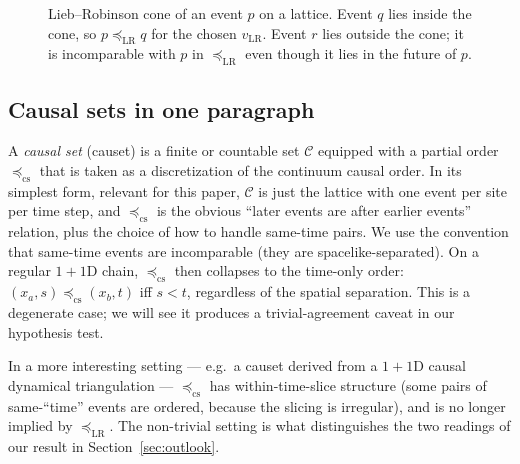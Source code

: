 \documentclass[11pt,a4paper]{article}
\theoremstyle{definition}
\theoremstyle{plain}
\theoremstyle{remark}
\newcommand{\LR}{\mathrm{LR}}
\newcommand{\cs}{\mathrm{cs}}
\begin{document}
\begin{figure}[h]
\centering
{}
\caption{Lieb--Robinson cone of an event $p$ on a lattice.  Event $q$
lies inside the cone, so $p \preceq_{\LR} q$ for the chosen $v_{\LR}$.
Event $r$ lies outside the cone; it is incomparable with $p$ in
$\preceq_{\LR}$ even though it lies in the future of $p$.}
\label{fig:lr-cone}
\end{figure}

\subsection{Causal sets in one paragraph}

A \emph{causal set} (causet) is a finite or countable set $\mathcal{C}$
equipped with a partial order $\preceq_{\cs}$ that is taken as a
discretization of the continuum causal order.  In its simplest form,
relevant for this paper, $\mathcal{C}$ is just the lattice with one
event per site per time step, and $\preceq_{\cs}$ is the obvious
``later events are after earlier events'' relation, plus the choice of
how to handle same-time pairs.  We use the convention that same-time
events are incomparable (they are spacelike-separated).  On a regular
$1{+}1$D chain, $\preceq_{\cs}$ then collapses to the time-only order:
$(x_a, s) \preceq_{\cs} (x_b, t)$ iff $s < t$, regardless of the
spatial separation.  This is a degenerate case; we will see it
produces a trivial-agreement caveat in our hypothesis test.

In a more interesting setting --- e.g.\ a causet derived from a
$1{+}1$D causal dynamical triangulation --- $\preceq_{\cs}$ has
within-time-slice structure (some pairs of same-``time'' events are
ordered, because the slicing is irregular), and is no longer
implied by $\preceq_{\LR}$.  The non-trivial setting is what
distinguishes the two readings of our result in
Section~\ref{sec:outlook}.
\end{document}
